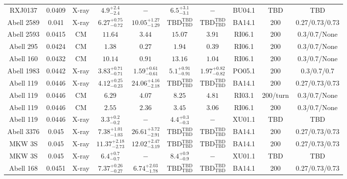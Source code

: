 \begin{table}
\begin{tabular}{cccccccccc}
RXJ0137 & 0.0409 & X-ray & ${4.9}^{+2.4}_{-2.4}$ & ${-}^{}_{}$ & ${6.5}^{+3.1}_{-3.1}$ & ${-}^{}_{}$ & BU04.1 & TBD & TBD \\
Abell 2589 & 0.041 & X-ray & ${6.27}^{+0.75}_{-0.72}$ & ${10.05}^{+1.27}_{-1.29}$ & ${\mathrm{TBD}}^{\mathrm{TBD}}_{\mathrm{TBD}}$ & ${\mathrm{TBD}}^{\mathrm{TBD}}_{\mathrm{TBD}}$ & BA14.1 & 200 & 0.27/0.73/0.73 \\
Abell 2593 & 0.0415 & CM & ${11.64}^{}_{}$ & ${3.44}^{}_{}$ & ${15.07}^{}_{}$ & ${3.91}^{}_{}$ & RI06.1 & 200 & 0.3/0.7/None \\
Abell 295 & 0.0424 & CM & ${1.38}^{}_{}$ & ${0.27}^{}_{}$ & ${1.94}^{}_{}$ & ${0.39}^{}_{}$ & RI06.1 & 200 & 0.3/0.7/None \\
Abell 160 & 0.0432 & CM & ${10.14}^{}_{}$ & ${0.91}^{}_{}$ & ${13.16}^{}_{}$ & ${1.04}^{}_{}$ & RI06.1 & 200 & 0.3/0.7/None \\
Abell 1983 & 0.0442 & X-ray & ${3.83}^{+0.71}_{-0.71}$ & ${1.59}^{+0.61}_{-0.61}$ & ${5.1}^{+0.91}_{-0.91}$ & ${1.97}^{+0.82}_{-0.82}$ & PO05.1 & 200 & 0.3/0.7/0.7 \\
Abell 119 & 0.0446 & X-ray & ${4.12}^{+0.25}_{-0.23}$ & ${24.06}^{+4.16}_{-2.18}$ & ${\mathrm{TBD}}^{\mathrm{TBD}}_{\mathrm{TBD}}$ & ${\mathrm{TBD}}^{\mathrm{TBD}}_{\mathrm{TBD}}$ & BA14.1 & 200 & 0.27/0.73/0.73 \\
Abell 119 & 0.0446 & CM & ${6.29}^{}_{}$ & ${4.07}^{}_{}$ & ${8.25}^{}_{}$ & ${4.81}^{}_{}$ & RI03.1 & 200/turn & 0.3/0.7/None \\
Abell 119 & 0.0446 & CM & ${2.55}^{}_{}$ & ${2.36}^{}_{}$ & ${3.45}^{}_{}$ & ${3.06}^{}_{}$ & RI06.1 & 200 & 0.3/0.7/None \\
Abell 119 & 0.0446 & X-ray & ${3.3}^{+0.2}_{-0.2}$ & ${-}^{}_{}$ & ${4.4}^{+0.3}_{-0.3}$ & ${-}^{}_{}$ & XU01.1 & TBD & TBD \\
Abell 3376 & 0.045 & X-ray & ${7.38}^{+1.01}_{-1.03}$ & ${26.61}^{+3.72}_{-2.91}$ & ${\mathrm{TBD}}^{\mathrm{TBD}}_{\mathrm{TBD}}$ & ${\mathrm{TBD}}^{\mathrm{TBD}}_{\mathrm{TBD}}$ & BA14.1 & 200 & 0.27/0.73/0.73 \\
MKW 3S & 0.045 & X-ray & ${11.37}^{+2.18}_{-2.73}$ & ${12.02}^{+2.47}_{-3.19}$ & ${\mathrm{TBD}}^{\mathrm{TBD}}_{\mathrm{TBD}}$ & ${\mathrm{TBD}}^{\mathrm{TBD}}_{\mathrm{TBD}}$ & BA14.1 & 200 & 0.27/0.73/0.73 \\
MKW 3S & 0.045 & X-ray & ${6.4}^{+0.7}_{-0.7}$ & ${-}^{}_{}$ & ${8.4}^{+0.9}_{-0.9}$ & ${-}^{}_{}$ & XU01.1 & TBD & TBD \\
Abell 168 & 0.0451 & X-ray & ${7.37}^{+0.26}_{-0.27}$ & ${6.74}^{+2.03}_{-1.78}$ & ${\mathrm{TBD}}^{\mathrm{TBD}}_{\mathrm{TBD}}$ & ${\mathrm{TBD}}^{\mathrm{TBD}}_{\mathrm{TBD}}$ & BA14.1 & 200 & 0.27/0.73/0.73 \\

\end{tabular}
\end{table}
